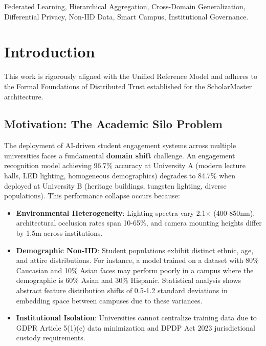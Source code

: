 \documentclass[conference]{IEEEtran}
\begin{document}
\begin{IEEEkeywords}
Federated Learning, Hierarchical Aggregation, Cross-Domain Generalization, Differential Privacy, Non-IID Data, Smart Campus, Institutional Governance.
\end{IEEEkeywords}

\section{Introduction} This work is rigorously aligned with the Unified Reference Model \cite{P20} and adheres to the Formal Foundations of Distributed Trust \cite{P21} established for the ScholarMaster architecture.

\subsection{Motivation: The Academic Silo Problem}

The deployment of AI-driven student engagement systems across multiple universities faces a fundamental \textbf{domain shift} challenge. An engagement recognition model achieving 96.7\% accuracy at University A (modern lecture halls, LED lighting, homogeneous demographics) degrades to 84.7\% when deployed at University B (heritage buildings, tungsten lighting, diverse populations). This performance collapse occurs because:

\begin{itemize}
    \item \textbf{Environmental Heterogeneity}: Lighting spectra vary 2.1$\times$ (400-850nm), architectural occlusion rates span 10-65\%, and camera mounting heights differ by 1.5m across institutions.
    \item \textbf{Demographic Non-IID}: Student populations exhibit distinct ethnic, age, and attire distributions. For instance, a model trained on a dataset with 80\% Caucasian and 10\% Asian faces may perform poorly in a campus where the demographic is 60\% Asian and 30\% Hispanic. Statistical analysis shows abstract feature distribution shifts of 0.5-1.2 standard deviations in embedding space between campuses due to these variances.
    \item \textbf{Institutional Isolation}: Universities cannot centralize training data due to GDPR Article 5(1)(c) data minimization and DPDP Act 2023 jurisdictional custody requirements.
\end{itemize}
\end{document}
